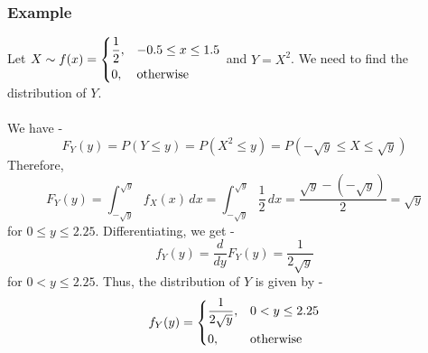 \documentclass[openany]{book}
\begin{document}
\subsubsection{Example}
Let $X \sim f(x) = \begin{dcases}
    \frac{1}{2}, & -0.5 \leq x \leq 1.5 \\
    0, & \text{otherwise}
    \end{dcases}$ 
    and $Y = X^2$. We need to find the distribution of $Y$. \\\\
We have -
$$F_Y(y) = P(Y \leq y) = P(X^2 \leq y) = P(-\sqrt{y} \leq X \leq \sqrt{y})$$
Therefore,
$$F_Y(y) = \int_{-\sqrt{y}}^{\sqrt{y}} f_X(x) \, dx = \int_{-\sqrt{y}}^{\sqrt{y}} \frac{1}{2} \, dx = \frac{\sqrt{y} - (-\sqrt{y})}{2} = \sqrt{y}$$
for $0 \leq y \leq 2.25$. Differentiating, we get -
$$f_Y(y) = \frac{d}{dy} F_Y(y) = \frac{1}{2\sqrt{y}}$$
for $0 < y \leq 2.25$. Thus, the distribution of $Y$ is given by -
$$f_Y(y) = \begin{dcases}
    \frac{1}{2\sqrt{y}}, & 0 < y \leq 2.25 \\
    0, & \text{otherwise}
\end{dcases}$$
\end{document}

